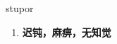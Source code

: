 
\begin{frame}
{\huge stupor}
\begin{center}
\begin{enumerate}\Large
  \item \textbf{迟钝，麻痹，无知觉}
\end{enumerate}
\end{center}
\end{frame}
